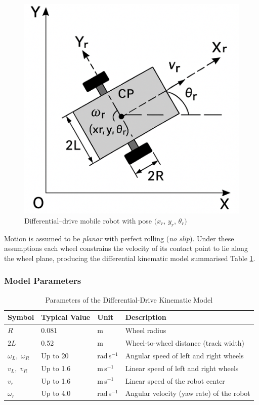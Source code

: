 \begin{figure}[H]
    \centering
    \includegraphics[width=0.5\linewidth]{Src/images/kinematicmodel.png}
    \caption{Differential–drive mobile robot with pose
             \(\bigl(x_r,\,y_r,\,\theta_r\bigr)\)}
    \label{fig:Differential-model}
\end{figure}

Motion is assumed to be \emph{planar} with perfect rolling
(\emph{no slip}).  
Under these assumptions each wheel constrains the velocity of its contact
point to lie along the wheel plane, producing the differential
kinematic model summarised Table \ref{tab:diff_drive_params_en}.
\subsubsection{Model Parameters}
\label{sec:model_parameters}

\begin{table}[H]
    \centering
    \caption{Parameters of the Differential-Drive Kinematic Model}
    \label{tab:diff_drive_params_en}
    \begin{tabular}{@{}llll@{}}
        \toprule
        \textbf{Symbol}& \textbf{Typical Value} & \textbf{Unit} & \textbf{Description}  \\
        \midrule
        \(R\)& 0.081 & m & Wheel radius  \\
        \(2L\) & 0.52  & m & Wheel-to-wheel distance (track width)\\
        \(\omega_L,\; \omega_R\) & Up to 20 & rad\,s\(^{-1}\) & Angular speed of left and right wheels \\
        \(v_L,\; v_R\)& Up to 1.6 & m\,s\(^{-1}\)  & Linear speed of left and right wheels \\
        \(v_r\)& Up to 1.6 & m\,s\(^{-1}\) & Linear speed of the robot center  \\
        \(\omega_r\)& Up to 4.0  & rad\,s\(^{-1}\)& Angular velocity (yaw rate) of the robot  \\
        \bottomrule
    \end{tabular}
\end{table}

